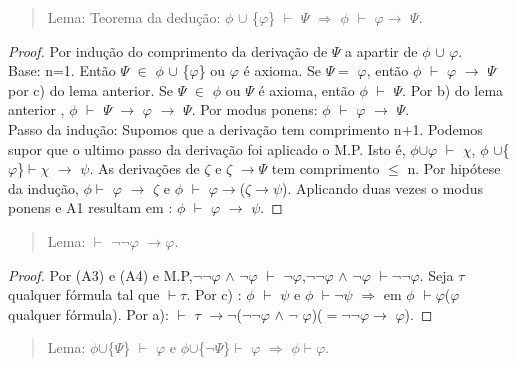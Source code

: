 \documentclass[12pt]{report}
\begin{document}
	
\begin{quote} 
Lema: Teorema da dedução: $\phi$ $\cup$ \{$\varphi$\} $\vdash$ $\Psi$ $\Longrightarrow$ $\phi$ $\vdash$ $\varphi$$\rightarrow$ $\Psi$.\end{quote}
\begin{proof} Por indução do comprimento da derivação de $\Psi$ a apartir de $\phi$ $\cup$ $\varphi$.\\
Base: n=1. Então $\Psi$ $\in$ $\phi$ $\cup$ \{$\varphi$\} ou $\varphi$ é axioma. Se $\Psi$$=$ $\varphi$, então $\phi$ $\vdash$ $\varphi$ $\rightarrow$ $\Psi$ por c) do lema anterior. Se $\Psi$ $\in$ $\phi$ ou $\Psi$ é axioma, então $\phi$ $\vdash$ $\Psi$. Por  b) do lema anterior , $\phi$ $\vdash$ $\Psi$ $\rightarrow$ $\varphi$ $\rightarrow$ $\Psi$. Por modus ponens: $\phi$ $\vdash$ $\varphi$ $\rightarrow$ $\Psi$.\\
Passo da indução: Supomos que a derivação tem comprimento n+1. Podemos supor que o ultimo passo da derivação foi aplicado o M.P. Isto é, $\phi$$\cup$$\varphi$ $\vdash$ $\chi$, $\phi$ $\cup$\{$\varphi$\}$\vdash$$\chi$ $\rightarrow$ $\psi$. As derivações de $\zeta$ e $\zeta$ $\rightarrow$$\Psi$ tem comprimento $\leq$ n. Por hipótese da indução, $\phi$$\vdash$ $\varphi$ $\rightarrow$ $\zeta$ e $\phi$ $\vdash$ $\varphi$$\rightarrow$($\zeta$$\rightarrow$$\psi$). Aplicando duas vezes o modus ponens e A1 resultam em : $\phi$ $\vdash$ $\varphi$ $\rightarrow$ $\psi$.\end{proof}
\begin{quote} Lema: $\vdash$ $\neg$$\neg$$\varphi$ $\rightarrow$$\varphi$.\end{quote}
\begin{proof} Por (A3) e (A4) e M.P,$\neg$$\neg$$\varphi$ $\land$ $\neg$$\varphi$ $\vdash$ $\neg$$\varphi$,$\neg$$\neg$$\varphi$ $\land$ $\neg$$\varphi$ $\vdash$$\neg$$\neg$$\varphi$. Seja $\tau$ qualquer fórmula tal que $\vdash$$\tau$. Por c) : $\phi$ $\vdash$ $\psi$ e $\phi$ $\vdash$$\neg$$\psi$ $\Longrightarrow$ em $\phi$ $\vdash$$\varphi$($\varphi$ qualquer fórmula). Por a): $\vdash$ $\tau$ $\rightarrow$$\neg$($\neg$$\neg$$\varphi$ $\land$ $\neg$ $\varphi$)($=$$\neg$$\neg$$\varphi$$\rightarrow$ $\varphi$).\end{proof}
\begin{quote} Lema: $\phi$$\cup$\{$\Psi$\} $\vdash$ $\varphi$ e $\phi$$\cup$\{$\neg$$\Psi$\}$\vdash$ $\varphi$ $\Longrightarrow$ $\phi$$\vdash$$\varphi$.\end{quote}
\end{document}
